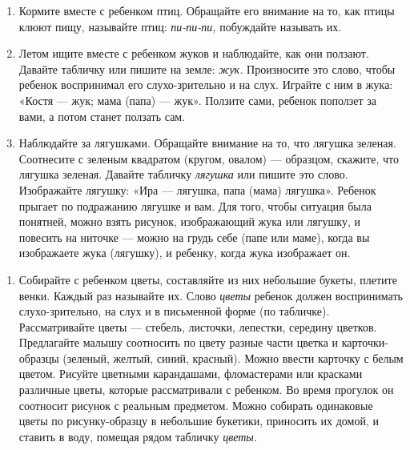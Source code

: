 \documentclass[a5paper]{book}
\renewcommand{\emph}[1]{\textit{#1}}
\begin{document}
\begin{enumerate}
\def\labelenumi{\arabic{enumi}.}
\item
  
  Кормите вместе с ребенком птиц. Обращайте его внимание на то, как
  птицы клюют пищу, называйте птиц: \emph{пи-пи-пи,} побуждайте называть
  их.
  
\item
  
  Летом ищите вместе с ребенком жуков и наблюдайте, как они ползают.
  Давайте табличку или пишите на земле: \emph{жук.} Произносите это
  слово, чтобы ребенок воспринимал его слухо-зрительно и на слух.
  Играйте с ним в жука: «Костя --- жук; мама (папа) --- жук». Ползите
  сами, ребенок поползет за вами, а потом станет ползать сам.
  
\item
  
  Наблюдайте за лягушками. Обращайте внимание на то, что лягушка
  зеленая. Соотнесите с зеленым квадратом (кругом, овалом) --- образцом,
  скажите, что лягушка зеленая. Давайте табличку \emph{лягушка} или
  пишите это слово. Изображайте лягушку: «Ира --- лягушка, папа (мама)
  лягушка». Ребенок прыгает по подражанию лягушке и вам. Для того, чтобы
  ситуация была понятней, можно взять рисунок, изображающий жука или
  лягушку, и повесить на ниточке --- можно на грудь себе (папе или
  маме), когда вы изображаете жука (лягушку), и ребенку, когда жука
  изображает он.
  
\end{enumerate}

\begin{enumerate}
\def\labelenumi{\arabic{enumi}.}
\item
  
  Собирайте с ребенком цветы, составляйте из них небольшие букеты,
  плетите венки. Каждый раз называйте их. Слово \emph{цветы} ребенок
  должен воспринимать слухо-зрительно, на слух и в письменной форме (по
  табличке). Рассматривайте цветы --- стебель, листочки, лепестки,
  середину цветков. Предлагайте малышу соотносить по цвету разные части
  цветка и карточки-образцы (зеленый, желтый, синий, красный). Можно
  ввести карточку с белым цветом. Рисуйте цветными карандашами,
  фломастерами или красками различные цветы, которые рассматривали с
  ребенком. Во время прогулок он соотносит рисунок с реальным предметом.
  Можно собирать одинаковые цветы по рисунку-образцу в небольшие
  букетики, приносить их домой, и ставить в воду, помещая рядом табличку
  \emph{цветы.}
  
\end{enumerate}
\end{document}
